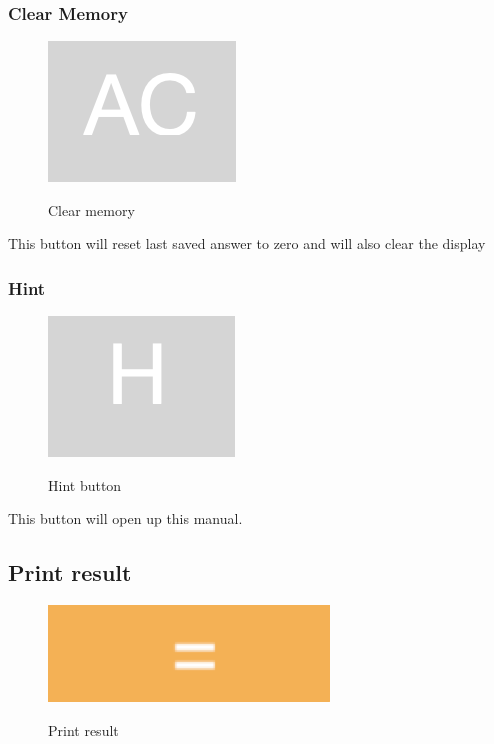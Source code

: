 \documentclass[11pt, a4paper]{article}
\begin{document}
    \subsubsection{Clear Memory}
    \label{subsubsec:clearmemory}

    \begin{figure}[hbt!]
        \caption{Clear memory}
        \includegraphics[scale = 0.2]{clear_memory}
        \centering
        \label{fig:c}
    \end{figure}
    This button will reset last saved answer to zero and will also clear the display

    \subsubsection{Hint}
    \label{subsubsec:hint}


    \begin{figure}[hbt!]
        \caption{Hint button}
        \includegraphics[scale = 0.2]{hint}
        \centering
        \label{fig:h}
    \end{figure}

    This button will open up this manual.

    \subsection{Print result}
    \begin{figure}[hbt!]
        \caption{Print result}
        \includegraphics[scale = 0.2]{plus}
        \centering
        \label{fig:print_result}
    \end{figure}
\end{document}
